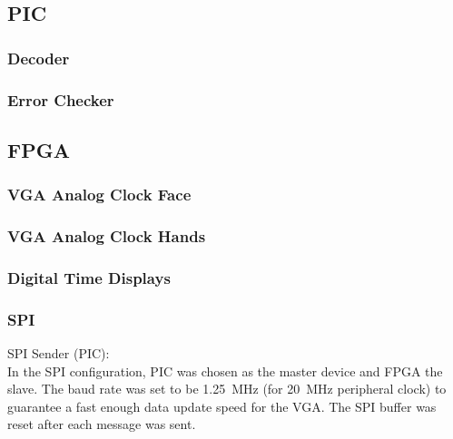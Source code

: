 \documentclass[11pt]{article}
\begin{document}
\subsection {PIC}

\subsubsection {Decoder}

\subsubsection {Error Checker}

\subsection {FPGA}

\subsubsection {VGA Analog Clock Face}

\subsubsection {VGA Analog Clock Hands}

\subsubsection {Digital Time Displays}

\subsubsection{SPI}

SPI Sender (PIC): \\
In the SPI configuration, PIC was chosen as the master device and FPGA the slave. The baud rate was set to be \SI{1.25}{\mega \hertz} (for \SI{20}{\mega \hertz} peripheral clock) to guarantee a fast enough data update speed for the VGA. The SPI buffer was reset after each message was sent.
\end{document}
